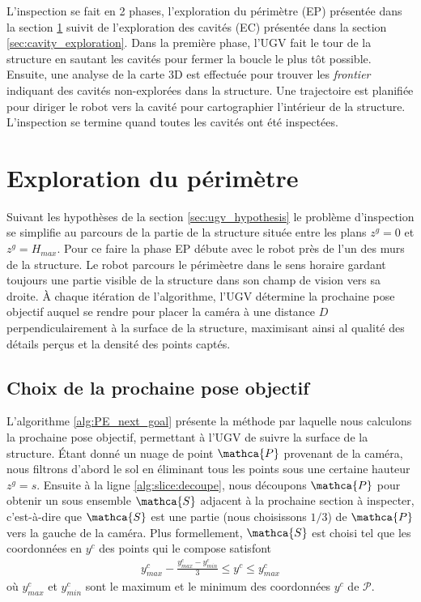 L'inspection se fait en 2 phases, l'exploration du périmètre (EP) présentée dans la section \ref{sec:perimeter_exploration} suivit de l'exploration des cavités (EC) présentée dans la section \ref{sec:cavity_exploration}. Dans la première phase, l'UGV fait le tour de la structure en sautant les cavités pour fermer la boucle le plus tôt possible. Ensuite, une analyse de la carte 3D est effectuée pour trouver les \textit{frontier} indiquant des cavités non-explorées dans la structure. Une trajectoire est planifiée pour diriger le robot vers la cavité pour cartographier l'intérieur de la structure. L'inspection se termine quand toutes les cavités ont été inspectées.

\section{Exploration du périmètre} \label{sec:perimeter_exploration}

Suivant les hypothèses de la section \ref{sec:ugv_hypothesis} le problème d'inspection se simplifie au parcours de la partie de la structure située entre les plans $z^g = 0$ et $z^g = H_{max}$. Pour ce faire la phase EP débute avec le robot près de l'un des murs de la structure. Le robot parcours le périmèetre dans le sens horaire gardant toujours une partie visible de la structure dans son champ de vision vers sa droite. À chaque itération de l'algorithme, l'UGV détermine la prochaine pose objectif auquel se rendre pour placer la caméra à une distance $D$ perpendiculairement à la surface de la structure, maximisant ainsi al qualité des détails perçus et la densité des points captés.

\subsection{Choix de la prochaine pose objectif}

L'algorithme \ref{alg:PE_next_goal} présente la méthode par laquelle nous calculons la prochaine pose objectif, permettant à l'UGV de suivre la surface de la structure. Étant donné un nuage de point $\mathca{P}$ provenant de la caméra, nous filtrons d'abord le sol en éliminant tous les points sous une certaine hauteur $z^g = s$. Ensuite à la ligne \ref{alg:slice:decoupe}, nous découpons $\mathca{P}$ pour obtenir un sous ensemble $\mathca{S}$ adjacent à la prochaine section à inspecter, c'est-à-dire que $\mathca{S}$ est une partie (nous choisissons $1/3$) de $\mathca{P}$ vers la gauche de la caméra. Plus formellement, $\mathca{S}$ est choisi tel que les coordonnées en $y^c$ des points qui le compose satisfont
\begin{align}
  y^c_{max} - \frac{y^c_{max} - y^c_{min}}{3} \leq y^c \leq y^c_{max}
\end{align}
où $y^c_{max}$ et $y^c_{min}$ sont le maximum et le minimum des coordonnées $y^c$ de $\mathcal{P}$.

